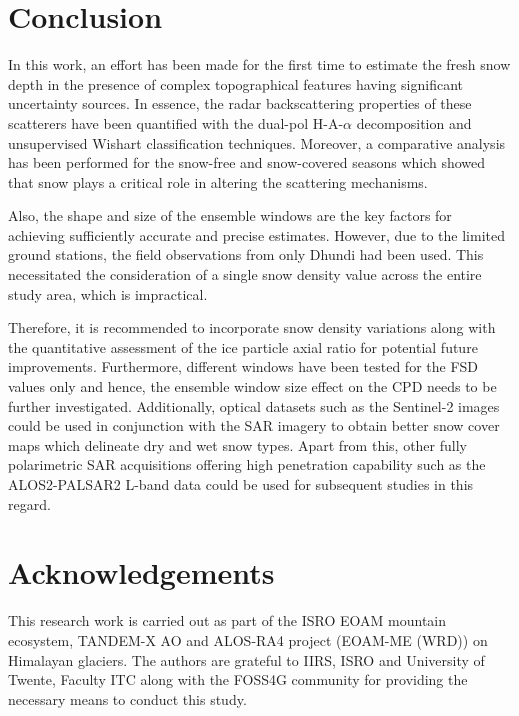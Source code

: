 \documentclass{article}
\begin{document}
\section{Conclusion}
\label{sec:concl}
In this work, an effort has been made for the first time to estimate the fresh snow depth in the presence of complex topographical features having significant uncertainty sources. In essence, the radar backscattering properties of these scatterers have been quantified with the dual-pol H-A-$\alpha$ decomposition and unsupervised Wishart classification techniques. Moreover, a comparative analysis has been performed for the snow-free and snow-covered seasons which showed that snow plays a critical role in altering the scattering mechanisms. 

Also, the shape and size of the ensemble windows are the key factors for achieving sufficiently accurate and precise estimates. However, due to the limited ground stations, the field observations from only Dhundi had been used. This necessitated the consideration of a single snow density value across the entire study area, which is impractical.

Therefore, it is recommended to incorporate snow density variations along with the quantitative assessment of the ice particle axial ratio for potential future improvements. Furthermore, different windows have been tested for the FSD values only and hence, the ensemble window size effect on the CPD needs to be further investigated. Additionally, optical datasets such as the Sentinel-2 images could be used in conjunction with the SAR imagery to obtain better snow cover maps which delineate dry and wet snow types.  Apart from this, other fully polarimetric SAR acquisitions offering high penetration capability such as the ALOS2-PALSAR2 L-band data could be used for subsequent studies in this regard. 

\section{Acknowledgements}
\label{sec: ack}
This research work is carried out as part of the ISRO EOAM mountain ecosystem, TANDEM-X AO and ALOS-RA4 project (EOAM-ME (WRD)) on Himalayan glaciers. The authors are grateful to IIRS, ISRO and University of Twente, Faculty ITC along with the FOSS4G community for providing the necessary means to conduct this study.  



\end{document}
